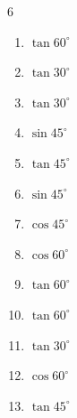 \begin{multicols}{6}
\begin{enumerate}
  \item $\displaystyle \tan{60^\circ}$


  \item $\displaystyle \tan{30^\circ}$


  \item $\displaystyle \tan{30^\circ}$


  \item $\displaystyle \sin{45^\circ}$


  \item $\displaystyle \tan{45^\circ}$

        \phantom{$\displaystyle =1$}

  \item $\displaystyle \sin{45^\circ}$


  \item $\displaystyle \cos{45^\circ}$


  \item $\displaystyle \cos{60^\circ}$


  \item $\displaystyle \tan{60^\circ}$


\columnbreak %

  \item $\displaystyle \tan{60^\circ}$


  \item $\displaystyle \tan{30^\circ}$


  \item $\displaystyle \cos{60^\circ}$


  \item $\displaystyle \tan{45^\circ}$


\end{enumerate}
\end{multicols}
